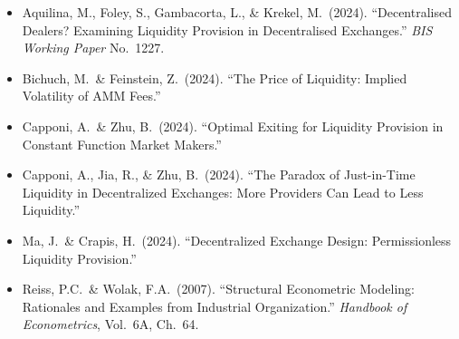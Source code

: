 \begin{itemize}
  \item Aquilina, M., Foley, S., Gambacorta, L., \& Krekel, M.\ (2024).
    ``Decentralised Dealers? Examining Liquidity Provision in Decentralised
    Exchanges.'' \emph{BIS Working Paper} No.~1227.
  \item Bichuch, M.\ \& Feinstein, Z.\ (2024).
    ``The Price of Liquidity: Implied Volatility of AMM Fees.''
  \item Capponi, A.\ \& Zhu, B.\ (2024).
    ``Optimal Exiting for Liquidity Provision in Constant Function Market Makers.''
  \item Capponi, A., Jia, R., \& Zhu, B.\ (2024).
    ``The Paradox of Just-in-Time Liquidity in Decentralized Exchanges:
    More Providers Can Lead to Less Liquidity.''
  \item Ma, J.\ \& Crapis, H.\ (2024).
    ``Decentralized Exchange Design: Permissionless Liquidity Provision.''
  \item Reiss, P.C.\ \& Wolak, F.A.\ (2007).
    ``Structural Econometric Modeling: Rationales and Examples from
    Industrial Organization.'' \emph{Handbook of Econometrics}, Vol.~6A, Ch.~64.
\end{itemize}
